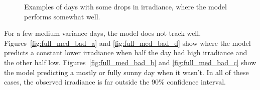 {\begin{figure}
    \qquad
    \qquad
    \caption{Examples of days with some drops in irradiance, where the model performs somewhat well.
    \label{fig:full_med_med}}
\end{figure}
\clearpage
}

For a few medium variance days, the model does not track well. Figures~\ref{fig:full_med_bad_a} and \ref{fig:full_med_bad_d} show where the model predicts a constant lower irradiance when half the day had high irradiance and the other half low. Figures~\ref{fig:full_med_bad_b} and \ref{fig:full_med_bad_c} show the model predicting a mostly or fully sunny day when it wasn't. In all of these cases, the observed irradiance is far outside the 90\% confidence interval.

